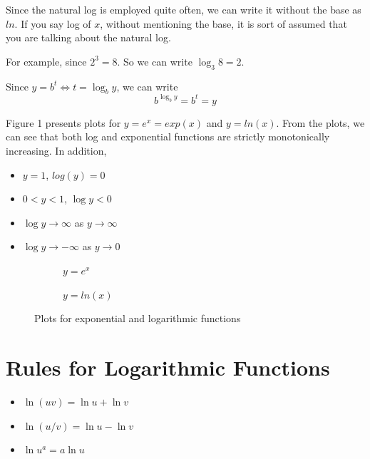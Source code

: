 \documentclass{./../../latex/handout}
\begin{document}
Since the natural log is employed quite often, we can write it without the base as $ln$. If you say log of $x$, without mentioning the base, it is sort of assumed that you are talking about the natural log. 

For example, since $2^{3}=8$. So we can write $\log _{3} 8=2$. 

Since $y=b^{t} \Longleftrightarrow t=\log _{b} y$, we can write
\[
b^{\log _{b} y}=b^{t}=y
\]

Figure 1 presents plots for $y = e^x = exp(x)$ and $y=ln(x)$. From the plots, we can see that both log and exponential functions are strictly monotonically increasing. In addition,
\begin{itemize}
	\item $y=1$, $log(y) = 0$
	\item $0<y<1$,  $\log y<0$
	\item $\log y \rightarrow \infty$ as $y \rightarrow \infty$
	\item $\log y \rightarrow-\infty$ as $y \rightarrow 0$
\end{itemize}


\pgfplotsset{%
    width=8cm,
    height=7cm
}
\begin{figure}[t]
\begin{subfigure}[b]{0.5\textwidth}
\caption{$y = e^x$}
\end{subfigure}
\begin{subfigure}[b]{0.5\textwidth}
\caption{$y =ln(x)$}
\end{subfigure}
\caption{Plots for exponential and logarithmic functions}
\end{figure}


\section{Rules for Logarithmic Functions}
\begin{itemize}
	\item $\ln (u v)=\ln u+\ln v$ 
	\item $\ln (u / v)=\ln u-\ln v$
	\item $\ln u^{a}=a \ln u$
\end{itemize}
\end{document}
